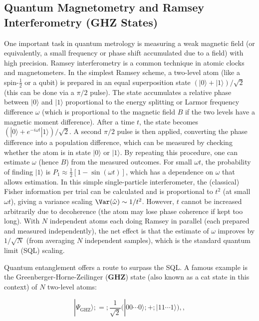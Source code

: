 \subsection{Quantum Magnetometry and Ramsey Interferometry (GHZ States)}

\label{sec:GHZ-Ramsey}



One important task in quantum metrology is measuring a weak magnetic
field (or equivalently, a small frequency or phase shift accumulated
due to a field) with high precision. Ramsey interferometry is a common
technique in atomic clocks and magnetometers. In the simplest Ramsey
scheme, a two-level atom (like a spin-$\frac{1}{2}$ or a qubit) is
prepared in an equal superposition state $(|0\rangle +
|1\rangle)/\sqrt{2}$ (this can be done via a $\pi/2$ pulse). The state
accumulates a relative phase between $|0\rangle$ and $|1\rangle$
proportional to the energy splitting or Larmor frequency difference
$\omega$ (which is proportional to the magnetic field $B$ if the two
levels have a magnetic moment difference). After a time $t$, the state
becomes $(|0\rangle + e^{-i\omega t}|1\rangle)/\sqrt{2}$. A second
$\pi/2$ pulse is then applied, converting the phase difference into a
population difference, which can be measured by checking whether the
atom is in state $|0\rangle$ or $|1\rangle$. By repeating this
procedure, one can estimate $\omega$ (hence $B$) from the measured
outcomes. For small $\omega t$, the probability of finding $|1\rangle$
is $P_1 \approx \frac{1}{2}[1 - \sin(\omega t)]$, which has a
dependence on $\omega$ that allows estimation. In this simple
single-particle interferometer, the (classical) Fisher information per
trial can be calculated and is proportional to $t^2$ (at small $\omega
t$), giving a variance scaling $\Var(\hat{\omega}) \sim
1/t^2$. However, $t$ cannot be increased arbitrarily due to
decoherence (the atom may lose phase coherence if kept too long). With
$N$ independent atoms each doing Ramsey in parallel (each prepared and
measured independently), the net effect is that the estimate of
$\omega$ improves by $1/\sqrt{N}$ (from averaging $N$ independent
samples), which is the standard quantum limit (SQL) scaling.



Quantum entanglement offers a route to surpass the SQL. A famous
example is the Greenberger-Horne-Zeilinger (\textbf{GHZ}) state (also
known as a cat state in this context) of $N$ two-level atoms:

\begin{equation}
|\Psi_{\text{GHZ}}\rangle ;=; \frac{1}{\sqrt{2}}\Big(|0 0 \cdots 0\rangle ;+; |1 1 \cdots 1\rangle\Big) ,,
\label{eq:GHZ-state}
\end{equation}

